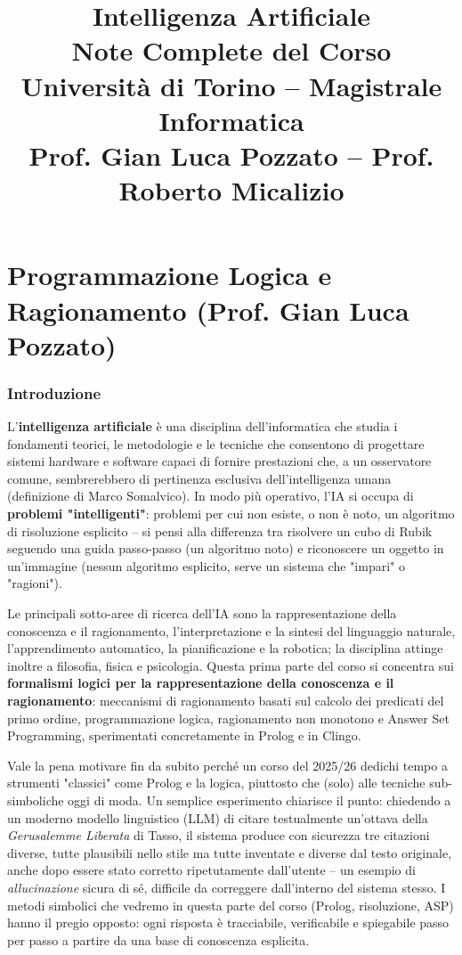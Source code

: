\documentclass[a4paper,11pt]{article}
\title{\textbf{Intelligenza Artificiale}\\[0.5em]
\large Note Complete del Corso\\[0.3em]
\normalsize Università di Torino -- Magistrale Informatica\\
Prof. Gian Luca Pozzato -- Prof. Roberto Micalizio}
\author{}
\date{}
\begin{document}
\maketitle
\tableofcontents
\newpage

\part{Programmazione Logica e Ragionamento (Prof. Gian Luca Pozzato)}

\section{Introduzione}

L'\textbf{intelligenza artificiale} è una disciplina dell'informatica che studia i fondamenti teorici, le metodologie e le tecniche che consentono di progettare sistemi hardware e software capaci di fornire prestazioni che, a un osservatore comune, sembrerebbero di pertinenza esclusiva dell'intelligenza umana (definizione di Marco Somalvico). In modo più operativo, l'IA si occupa di \textbf{problemi "intelligenti"}: problemi per cui non esiste, o non è noto, un algoritmo di risoluzione esplicito -- si pensi alla differenza tra risolvere un cubo di Rubik seguendo una guida passo-passo (un algoritmo noto) e riconoscere un oggetto in un'immagine (nessun algoritmo esplicito, serve un sistema che "impari" o "ragioni").

Le principali sotto-aree di ricerca dell'IA sono la rappresentazione della conoscenza e il ragionamento, l'interpretazione e la sintesi del linguaggio naturale, l'apprendimento automatico, la pianificazione e la robotica; la disciplina attinge inoltre a filosofia, fisica e psicologia. Questa prima parte del corso si concentra sui \textbf{formalismi logici per la rappresentazione della conoscenza e il ragionamento}: meccanismi di ragionamento basati sul calcolo dei predicati del primo ordine, programmazione logica, ragionamento non monotono e Answer Set Programming, sperimentati concretamente in Prolog e in Clingo.

Vale la pena motivare fin da subito perché un corso del 2025/26 dedichi tempo a strumenti "classici" come Prolog e la logica, piuttosto che (solo) alle tecniche sub-simboliche oggi di moda. Un semplice esperimento chiarisce il punto: chiedendo a un moderno modello linguistico (LLM) di citare testualmente un'ottava della \emph{Gerusalemme Liberata} di Tasso, il sistema produce con sicurezza tre citazioni diverse, tutte plausibili nello stile ma tutte inventate e diverse dal testo originale, anche dopo essere stato corretto ripetutamente dall'utente -- un esempio di \emph{allucinazione} sicura di sé, difficile da correggere dall'interno del sistema stesso. I metodi simbolici che vedremo in questa parte del corso (Prolog, risoluzione, ASP) hanno il pregio opposto: ogni risposta è tracciabile, verificabile e spiegabile passo per passo a partire da una base di conoscenza esplicita.
\end{document}

